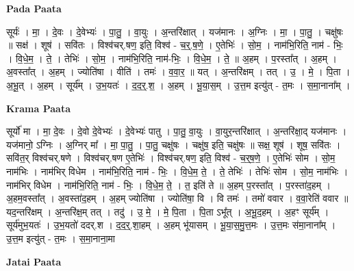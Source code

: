 \documentclass[17pt]{extarticle}
\begin{document}
\textbf{Pada Paata} \newline

सूर्यः॑ । मा॒ । दे॒वः । दे॒वेभ्यः॑ । पा॒तु॒ । वा॒युः । अ॒न्तरि॑क्षात् । यज॑मानः । अ॒ग्निः । मा॒ । पा॒तु॒ । चक्षु॑षः ॥ सक्ष॑ । शूष॑ । सवि॑तः । विश्व॑चर्.षण॒ इति॒ विश्व॑ - च॒र्॒.ष॒णे॒ । ए॒तेभिः॑ । सो॒म॒ । नाम॑भि॒रिति॒ नाम॑ - भिः॒ । वि॒धे॒म॒ । ते॒ । तेभिः॑ । सो॒म॒ । नाम॑भि॒रिति॒ नाम॑-भिः॒ । वि॒धे॒म॒ । ते॒ ॥ अ॒हम् । प॒रस्ता᳚त् । अ॒हम् । अ॒वस्ता᳚त् । अ॒हम् । ज्योति॑षा । वीति॑ । तमः॑ । व॒वा॒र॒ ॥ यत् । अ॒न्तरि॑क्षम् । तत् । उ॒ । मे॒ । पि॒ता । अ॒भू॒त् । अ॒हम् । सूर्य᳚म् । उ॒भ॒यतः॑ । द॒द॒र्॒.श॒ । अ॒हम् । भू॒या॒स॒म् । उ॒त्त॒म इत्यु॑त् - त॒मः । स॒मा॒नाना᳚म् ।  \newline


\textbf{Krama Paata} \newline

सूर्यो॑ मा । मा॒ दे॒वः । दे॒वो दे॒वेभ्यः॑ । दे॒वेभ्यः॑ पातु । पा॒तु॒ वा॒युः । वा॒युर॒न्तरि॑क्षात् । अ॒न्तरि॑क्षा॒द् यज॑मानः । यज॑मानो॒ ऽग्निः । अ॒ग्निर् मा᳚ । मा॒ पा॒तु॒ । पा॒तु॒ चक्षु॑षः । चक्षु॑ष॒ इति॒ चक्षु॑षः ॥ सक्ष॒ शूष॑ । शूष॒ सवि॑तः । सवि॑त॒र् विश्व॑चर्.षणे । विश्व॑चर्.षण ए॒तेभिः॑ । विश्व॑चर्.षण॒ इति॒ विश्व॑ - च॒र्॒ष॒णे॒ । ए॒तेभिः॑ सोम । सो॒म॒ नाम॑भिः । नाम॑भिर् विधेम । नाम॑भि॒रिति॒ नाम॑ - भिः॒ । वि॒धे॒म॒ ते॒ । ते॒ तेभिः॑ । तेभिः॑ सोम । सो॒म॒ नाम॑भिः । नाम॑भिर् विधेम । नाम॑भि॒रिति॒ नाम॑ - भिः॒ । वि॒धे॒म॒ ते॒ । त॒ इति॑ ते ॥ अ॒हम् प॒रस्ता᳚त् । प॒रस्ता॑द॒हम् । अ॒हम॒वस्ता᳚त् । अ॒वस्ता॑द॒हम् । अ॒हम् ज्योति॑षा । ज्योति॑षा॒ वि । वि तमः॑ । तमो॑ ववार । व॒वा॒रेति॑ ववार ॥ यद॒न्तरि॑क्षम् । अ॒न्तरि॑क्ष॒म् तत् । तदु॑ । उ॒ मे॒ । मे॒ पि॒ता । पि॒ता ऽभू᳚त् । अ॒भू॒द॒हम् । अ॒हꣳ सूर्य᳚म् । सूर्य॑मुभ॒यतः॑ । उ॒भ॒यतो॑ ददर्.श । द॒द॒र्॒.शा॒हम् । अ॒हम् भू॑यासम् । भू॒या॒स॒मु॒त्त॒मः । उ॒त्त॒मः स॑मा॒नाना᳚म् । उ॒त्त॒म इत्यु॑त् - त॒मः । स॒मा॒नाना॒मा \newline

\textbf{Jatai Paata} \newline
\end{document}
